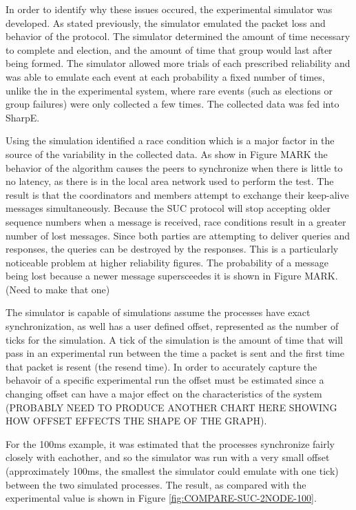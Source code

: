 In order to identify why these issues occured, the experimental simulator was
developed. As stated previously, the simulator emulated the packet loss and
behavior of the protocol. The simulator determined the amount of time necessary
to complete and election, and the amount of time that group would last after
being formed. The simulator allowed more trials of each prescribed reliability
and was able to emulate each event at each probability a fixed number of times,
unlike the in the experimental system, where rare events (such as elections
or group failures) were only collected a few times. The collected data was fed
into SharpE.

Using the simulation identified a race condition which is a major factor in the
source of the variability in the collected data. As show in Figure MARK the 
behavior of the algorithm causes the peers to synchronize when there is little
to no latency, as there is in the local area network used to perform the test.
The result is that the coordinators and members attempt to exchange their
keep-alive messages simultaneously. Because the SUC protocol will stop accepting
older sequence numbers when a message is received, race conditions result in
a greater number of lost messages. Since both parties are attempting to
deliver queries and responses, the queries can be destroyed by the responses.
This is a particularly noticeable problem at higher reliability figures. The
probability of a message being lost because a newer message supersceedes it
is shown in Figure MARK. (Need to make that one)

The simulator is capable of simulations assume the processes have exact
synchronization, as well has a user defined offset, represented as the number
of ticks for the simulation. A tick of the simulation is the amount of time
that will pass in an experimental run between the time a packet is sent and
the first time that packet is resent (the resend time). In order to accurately
capture the behavoir of a specific experimental run the offset must be estimated
since a changing offset can have a major effect on the characteristics of the
system (PROBABLY NEED TO PRODUCE ANOTHER CHART HERE SHOWING HOW OFFSET EFFECTS THE SHAPE OF THE GRAPH).

For the 100ms example, it was estimated that the processes synchronize fairly
closely with eachother, and so the simulator was run with a very small offset (approximately 100ms, the smallest the simulator could emulate with one tick)
between the two simulated processes. The result, as compared with the
experimental value is shown in Figure \ref{fig:COMPARE-SUC-2NODE-100}.

